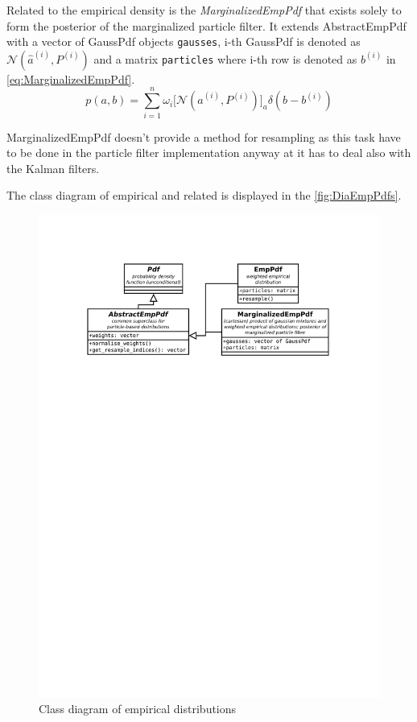 Related to the empirical density is the \emph{MarginalizedEmpPdf} that exists solely to form the
posterior {\pdf} of the marginalized particle filter. It extends AbstractEmpPdf with a vector of
GaussPdf objects \verb|gausses|, i-th GaussPdf is denoted as \(\mathcal{N}\left(\hat{a}^{(i)},
P^{(i)}\right)\) and a matrix \verb|particles| where i-th row is denoted as \(b^{(i)}\) in
\eqref{eq:MarginalizedEmpPdf}.
\begin{equation} \label{eq:MarginalizedEmpPdf}
	p(a, b) = \sum_{i=1}^n \omega_i \Big[ \mathcal{N}\left(\hat{a}^{(i)}, P^{(i)}\right) \Big]_a
		\delta(b - b^{(i)})
\end{equation}

MarginalizedEmpPdf doesn't provide a method for resampling as this task have to be done in the
particle filter implementation anyway at it has to deal also with the Kalman filters.

The class diagram of empirical {\pdfs} and related is displayed in the \autoref{fig:DiaEmpPdfs}.

\begin{figure}[h]
	\centering
	\includegraphics[width=\textwidth,keepaspectratio=true,clip=true,trim=3cm 210mm 3cm 3cm]{./diagrams/emp_pdfs.pdf}
	\vspace{-8mm}
	\caption{Class diagram of empirical distributions}
	\label{fig:DiaEmpPdfs}
\end{figure}

